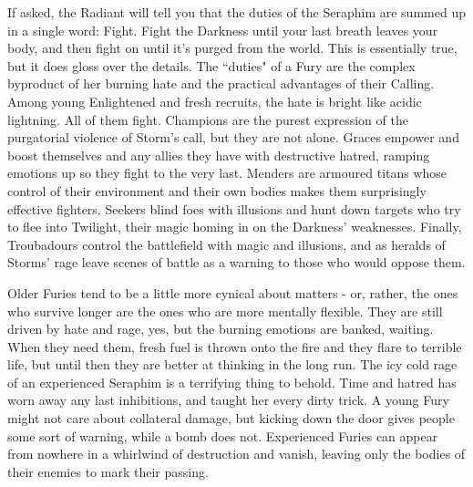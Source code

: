 If asked, the Radiant will tell you that the duties of the Seraphim are summed up in a single word: Fight. Fight the Darkness until your last breath leaves your body, and then fight on until it's purged from the world. This is essentially true, but it does gloss over the details. The \textquotedblleft duties" of a Fury are the complex byproduct of her burning hate and the practical advantages of their Calling. Among young Enlightened and fresh recruits, the hate is bright like acidic lightning. All of them fight. Champions are the purest expression of the purgatorial violence of Storm's call, but they are not alone. Graces empower and boost themselves and any allies they have with destructive hatred, ramping emotions up so they fight to the very last. Menders are armoured titans whose control of their environment and their own bodies makes them surprisingly effective fighters. Seekers blind foes with illusions and hunt down targets who try to flee into Twilight, their magic homing in on the Darkness' 
weaknesses. Finally, 
Troubadours control the battlefield with magic and illusions, and as heralds of Storms' rage leave scenes of battle as a warning to those who would oppose them.

Older Furies tend to be a little more cynical about matters - or, rather, the ones who survive longer are the ones who are more mentally flexible. They are still driven by hate and rage, yes, but the burning emotions are banked, waiting. When they need them, fresh fuel is thrown onto the fire and they flare to terrible life, but until then they are better at thinking in the long run. The icy cold rage of an experienced Seraphim is a terrifying thing to behold. Time and hatred has worn away any last inhibitions, and taught her every dirty trick. A young Fury might not care about collateral damage, but kicking down the door gives people some sort of warning, while a bomb does not. Experienced Furies can appear from nowhere in a whirlwind of destruction and vanish, leaving only the bodies of their enemies to mark their passing.

